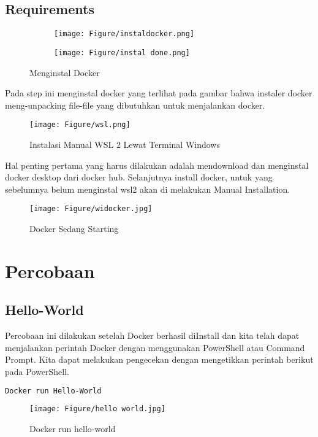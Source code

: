 \documentclass[11pt,a4paper]{article}
\begin{document}
\subsection{Requirements}
\begin{figure}[h]
        \centering
        \begin{subfigure}[b]{0.4\textwidth}
            \centering
            \def\svgwidth{\columnwidth}
            \texttt{[image: Figure/instaldocker.png]}
        \end{subfigure}
        \qquad %
        \begin{subfigure}[b]{0.4\textwidth}
            \centering
            \def\svgwidth{\columnwidth}
            \texttt{[image: Figure/instal done.png]}
        \end{subfigure}
        \caption{Menginstal Docker}\label{fig:aug}
    \end{figure}

Pada step ini menginstal docker yang terlihat pada gambar bahwa instaler docker meng-unpacking file-file yang dibutuhkan untuk menjalankan docker.
\begin{figure}[h]
	\centering
	\texttt{[image: Figure/wsl.png]}
	\caption{Instalasi Manual WSL 2 Lewat Terminal Windows}
\end{figure}
\newpage
Hal penting pertama yang harus dilakukan adalah mendownload dan menginstal docker desktop dari docker hub. Selanjutnya install docker, untuk yang sebelumnya belum menginstal wsl2 akan di melakukan Manual Installation.
\begin{figure}[h]
	\centering
	\texttt{[image: Figure/widocker.jpg]}
	\caption{Docker Sedang Starting}
\end{figure}
\newpage
\section{Percobaan}
\subsection{Hello-World}
Percobaan ini  dilakukan setelah Docker berhasil
diInstall dan kita telah dapat menjalankan perintah 
Docker dengan menggunakan PowerShell atau Command Prompt.
Kita dapat melakukan pengecekan dengan mengetikkan
perintah berikut pada PowerShell.
\begin{lstlisting}[language=bash]
	Docker run Hello-World
\end{lstlisting}
\begin{figure}[h]
	\centering
	\texttt{[image: Figure/hello world.jpg]}
	\caption{Docker run hello-world}
\end{figure}
\end{document}

